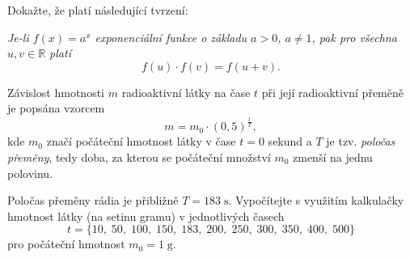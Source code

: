 \documentclass[12pt,a4paper]{article}
\begin{document}
\begin{exercise}

Dokažte, že platí následující tvrzení:

\medskip

\emph{Je-li $f(x)=a^x$ exponenciální funkce o základu $a>0$, $a\neq1$, pak pro všechna
$u,v\in\mathbb{R}$ platí}
\[
    f(u)\cdot f(v)=f(u+v).
\]
\end{exercise}


\begin{exercise}

Závislost hmotnosti $m$ radioaktivní látky na čase $t$ při její radioaktivní
přeměně je popsána vzorcem
\[
    m = m_0 \cdot \left(0{,}5\right)^{\frac{t}{T}},
\]
kde $m_0$ značí počáteční hmotnost látky v čase $t=0$ sekund a $T$ je tzv.
\textit{poločas přeměny}, tedy doba, za kterou se počáteční množství $m_0$
zmenší na jednu polovinu.

Poločas přeměny rádia je přibližně $T = 183\;\text{s}$.
Vypočítejte s využitím kalkulačky hmotnost látky (na setinu gramu)
v jednotlivých časech
\[
t = \{10,\; 50,\; 100,\; 150,\; 183,\; 200,\; 250,\; 300,\; 350,\; 400,\; 500\}
\]
pro počáteční hmotnost $m_0 = 1\;\text{g}$.
\end{exercise}
\end{document}

